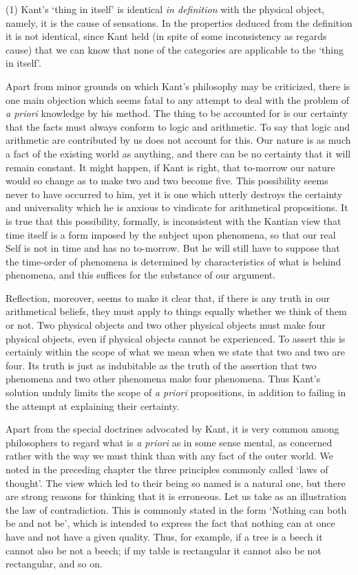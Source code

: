 \documentclass[oneside,letterpaper,12pt]{book}
\begin{document}
(1) Kant's `thing in
itself' is identical \emph{in definition} with the
physical object, namely, it is the cause of sensations. In the
properties deduced from the definition it is not identical, since Kant
held (in spite of some inconsistency as regards cause) that we can know
that none of the categories are applicable to the `thing
in itself'.

Apart from minor grounds on which Kant's philosophy may
be criticized, there is one main objection which seems fatal to any
attempt to deal with the problem of \emph{a priori} knowledge by his
method. \label{certainty} The thing to be accounted for is our certainty that the facts
must always conform to logic and arithmetic. To say that logic and
arithmetic are contributed by us does not account for this. Our nature
is as much a fact of the existing world as anything, and there can be no
certainty that it will remain constant. It might happen, if Kant is
right, that to-morrow our nature would so change as to make two and two
become five. This possibility seems never to have occurred to him, yet
it is one which utterly destroys the certainty and universality which he
is anxious to vindicate for arithmetical propositions. It is true that
this possibility, formally, is inconsistent with the Kantian view that
time itself is a form imposed by the subject upon phenomena, so that our
real Self is not in time and has no to-morrow. But he will still have to
suppose that the time-order of phenomena is determined by
characteristics of what is behind phenomena, and this suffices for the
substance of our argument.

Reflection, moreover, seems to make it clear that, if there is any truth
in our arithmetical beliefs, they must apply to things equally whether
we think of them or not. Two physical objects and two other physical
objects must make four physical objects, even if physical objects cannot
be experienced. To assert this is certainly within the scope of what we
mean when we state that two and two are four. Its truth is just as
indubitable as the truth of the assertion that two phenomena and two
other phenomena make four phenomena. Thus Kant's
solution unduly limits the scope of \emph{a priori} propositions, in
addition to failing in the attempt at explaining their certainty.

Apart from the special doctrines advocated by Kant, it is very common
among philosophers to regard what is \emph{a priori} as in some sense
mental, as concerned rather with the way we must think than with any
fact of the outer world. We noted in the preceding chapter the three
principles commonly called `laws of
thought'. The view which led to their being so named is a
natural one, but there are strong reasons for thinking that it is
erroneous. Let us take as an illustration the law of contradiction. This
is commonly stated in the form `Nothing can both be and
not be', which is intended to express the fact that
nothing can at once have and not have a given quality. Thus, for
example, if a tree is a beech it cannot also be not a beech; if my table
is rectangular it cannot also be not rectangular, and so on.
\end{document}
